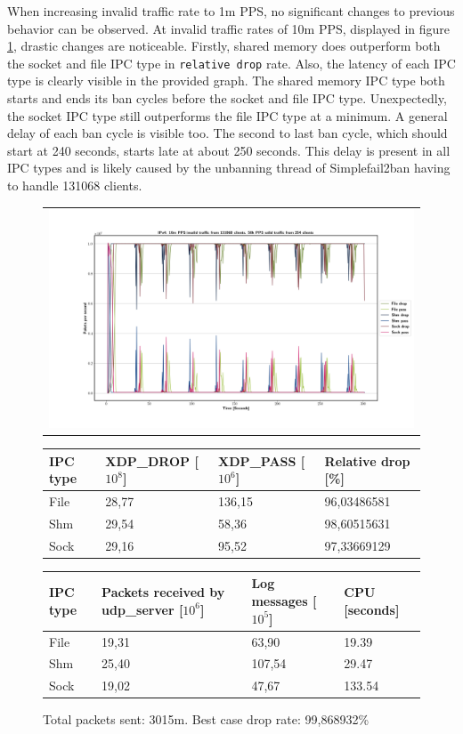 When increasing invalid traffic rate to 1m PPS, no significant changes to previous behavior can be observed.
At invalid traffic rates of 10m PPS, displayed in figure \ref{fig:data:ipv4:10m:131068}, drastic changes are noticeable.
Firstly, shared memory does outperform both the socket and file IPC type in \texttt{relative drop} rate.
Also, the latency of each IPC type is clearly visible in the provided graph.
The shared memory IPC type both starts and ends its ban cycles before the socket and file IPC type.
Unexpectedly, the socket IPC type still outperforms the file IPC type at a minimum.
A general delay of each ban cycle is visible too.
The second to last ban cycle, which should start at 240 seconds, starts late at about 250 seconds.
This delay is present in all IPC types and is likely caused by the unbanning thread of Simplefail2ban having to handle 131068 clients.

\begin{figure}[!h]
	\centering
	\scriptsize
	\begin{tabular}{c}
    	\centerline{\includegraphics[width=1.2\textwidth]{images/IPv4_10m_131068_1.png}}
	\end{tabular}
	\begin{tabular}{llll}
		\toprule
		\textbf{IPC type} & \textbf{XDP\_DROP [$10^8$]} & \textbf{XDP\_PASS [$10^6$]} & \textbf{Relative drop [\%]} \\ \midrule 
		File & 28,77 & 136,15 & 96,03486581 \\
        Shm & 29,54 & 58,36 & 98,60515631 \\
        Sock & 29,16 & 95,52 & 97,33669129 \\
	\bottomrule
	\end{tabular}
    \begin{tabular}{llll}
		\toprule
		\textbf{IPC type} & \textbf{Packets received by udp\_server [$10^6$]} & \textbf{Log messages [$10^5$]} & \textbf{CPU [seconds]} \\ \midrule 
		File & 19,31 & 63,90 & 19.39 \\
        Shm & 25,40 & 107,54 & 29.47 \\
        Sock & 19,02 & 47,67 & 133.54 \\
	\bottomrule
	\end{tabular}
	\caption[Simplefail2ban, IPv4, 10m \ac{PPS}, 131068 malicious clients]{Total packets sent: 3015m. Best case drop rate: 99,868932\%}
	\label{fig:data:ipv4:10m:131068}
\end{figure}

